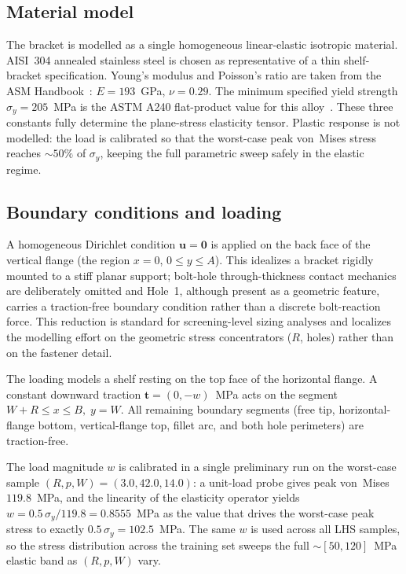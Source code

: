 \documentclass[11pt]{article}
\begin{document}
\subsection{Material model}

The bracket is modelled as a single homogeneous linear-elastic isotropic
material. AISI~304 annealed stainless steel is chosen as representative of
a thin shelf-bracket specification. Young's modulus and Poisson's ratio are
taken from the ASM Handbook~\cite{asm_handbook_vol1}:
$E = 193$~GPa, $\nu = 0.29$. The minimum specified yield strength
$\sigma_y = 205$~MPa is the ASTM A240 flat-product value for this
alloy~\cite{astm_a240}. These three constants fully determine the
plane-stress elasticity tensor. Plastic response is not modelled: the
load is calibrated so that the worst-case peak von~Mises stress reaches
$\sim 50\%$ of $\sigma_y$, keeping the full parametric sweep safely in the
elastic regime.

\subsection{Boundary conditions and loading}
\label{ssec:bcs}

A homogeneous Dirichlet condition $\boldsymbol{u} = \boldsymbol{0}$ is
applied on the back face of the vertical flange (the region $x = 0$,
$0 \leq y \leq A$). This idealizes a bracket rigidly mounted to a stiff
planar support; bolt-hole through-thickness contact mechanics are
deliberately omitted and Hole~1, although present as a geometric feature,
carries a traction-free boundary condition rather than a discrete
bolt-reaction force. This reduction is standard for screening-level
sizing analyses and localizes the modelling effort on the geometric
stress concentrators ($R$, holes) rather than on the fastener detail.

The loading models a shelf resting on the top face of the horizontal
flange. A constant downward traction
$\boldsymbol{t} = (0, -w)$~MPa acts on the segment
$W + R \leq x \leq B,\; y = W$. All remaining boundary segments (free tip,
horizontal-flange bottom, vertical-flange top, fillet arc, and both hole
perimeters) are traction-free.

The load magnitude $w$ is calibrated in a single preliminary run on the
worst-case sample $(R, p, W) = (3.0, 42.0, 14.0)$: a unit-load probe gives
peak von~Mises $119.8$~MPa, and the linearity of the elasticity operator
yields $w = 0.5\,\sigma_y / 119.8 = 0.8555$~MPa as the value that drives
the worst-case peak stress to exactly $0.5\,\sigma_y = 102.5$~MPa. The
same $w$ is used across all LHS samples, so the stress distribution
across the training set sweeps the full $\sim [50, 120]$~MPa elastic band
as $(R, p, W)$ vary.
\end{document}
